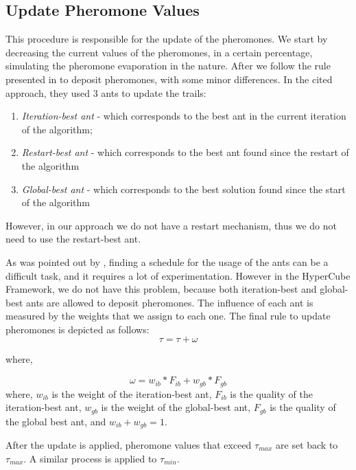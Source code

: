			\subsection{Update Pheromone Values}
			This procedure is responsible for the update of the pheromones. We start by decreasing the current values of the pheromones, in a certain percentage, simulating the pheromone evaporation in the nature. After we follow the rule presented in \cite{blum04} to deposit pheromones, with some minor differences. In the cited approach, they used 3 ants to update the trails:
			\begin{enumerate}
				\item \emph{Iteration-best ant} - which corresponds to the best ant in the current iteration of the algorithm;
				\item \emph{Restart-best ant} - which corresponds to the best ant found since the restart of the algorithm
				\item \emph{Global-best ant} - which corresponds to the best solution found since the start of the algorithm
			\end{enumerate}
			
			However, in our approach we do not have a restart mechanism, thus we do not need to use the restart-best ant. 

			As was pointed out by \cite{blum04}, finding a schedule for the usage of the ants can be a difficult task, and it requires a lot of experimentation. However in the HyperCube Framework, we do not have this problem, because both iteration-best and global-best ants are allowed to deposit pheromones. The influence of each ant is measured by the weights that we assign to each one. The final rule to update pheromones is depicted as follows:
			\begin{equation}
				\tau = \tau + \omega
			\end{equation}
			
			where,
			
			\begin{equation}
				\omega = w_{ib} * F_{ib} + w_{gb} * F_{gb}
			\end{equation}
			where, $w_{ib}$ is the weight of the iteration-best ant, $F_{ib}$ is the quality of the iteration-best ant, $w_{gb}$ is the weight of the global-best ant, $F_{gb}$ is the quality of the global best ant, and $w_{ib} + w_{gb} = 1$.
			
			After the update is applied, pheromone values that exceed $\tau_{max}$ are set back to $\tau_{max}$. A similar process is applied to $\tau_{min}$.

